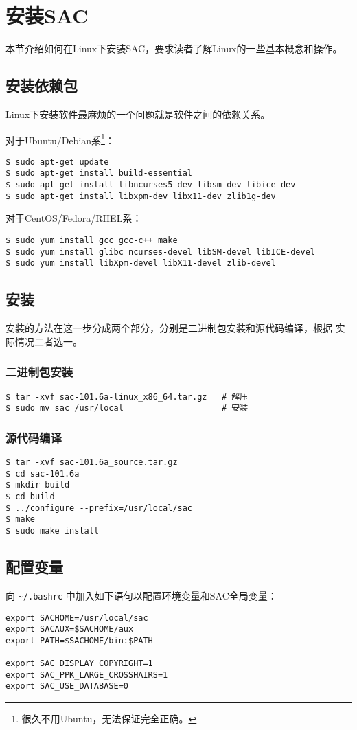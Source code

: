\section{安装SAC}
\label{sec:sac-install}
本节介绍如何在Linux下安装SAC，要求读者了解Linux的一些基本概念和操作。

\subsection*{安装依赖包}
Linux下安装软件最麻烦的一个问题就是软件之间的依赖关系。

对于Ubuntu/Debian系\footnote{很久不用Ubuntu，无法保证完全正确。}：
\begin{verbatim}
$ sudo apt-get update
$ sudo apt-get install build-essential
$ sudo apt-get install libncurses5-dev libsm-dev libice-dev
$ sudo apt-get install libxpm-dev libx11-dev zlib1g-dev
\end{verbatim}

对于CentOS/Fedora/RHEL系：
\begin{verbatim}
$ sudo yum install gcc gcc-c++ make
$ sudo yum install glibc ncurses-devel libSM-devel libICE-devel
$ sudo yum install libXpm-devel libX11-devel zlib-devel
\end{verbatim}

\subsection*{安装}
安装的方法在这一步分成两个部分，分别是二进制包安装和源代码编译，根据
实际情况二者选一。
\subsubsection*{二进制包安装}
\begin{verbatim}
$ tar -xvf sac-101.6a-linux_x86_64.tar.gz   # 解压
$ sudo mv sac /usr/local                    # 安装
\end{verbatim}

\subsubsection*{源代码编译}
\begin{verbatim}
$ tar -xvf sac-101.6a_source.tar.gz
$ cd sac-101.6a
$ mkdir build
$ cd build
$ ../configure --prefix=/usr/local/sac
$ make
$ sudo make install
\end{verbatim}

\subsection*{配置变量}
向 \verb|~/.bashrc| 中加入如下语句以配置环境变量和SAC全局变量：
\begin{verbatim}
export SACHOME=/usr/local/sac
export SACAUX=$SACHOME/aux
export PATH=$SACHOME/bin:$PATH

export SAC_DISPLAY_COPYRIGHT=1
export SAC_PPK_LARGE_CROSSHAIRS=1
export SAC_USE_DATABASE=0
\end{verbatim}

